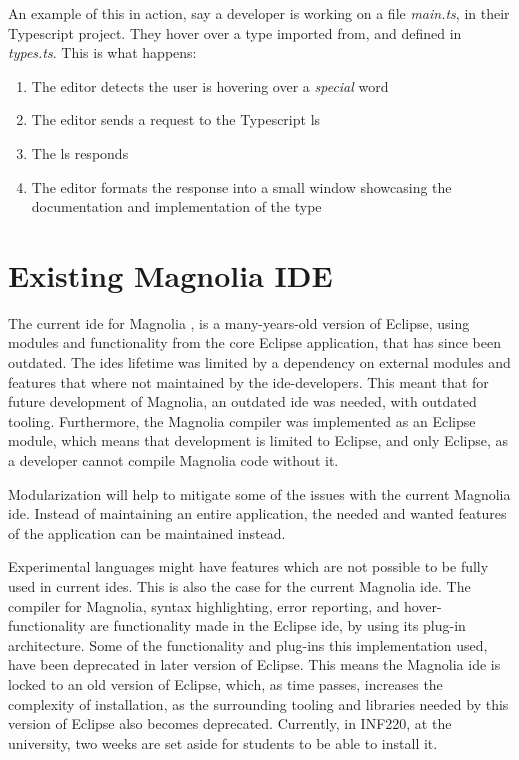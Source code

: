 An example of this in action, say a developer is working on a file
\textit{main.ts}, in their Typescript project. They hover over a type imported
from, and defined in \textit{types.ts}. This is what happens:

\begin{enumerate}
  \item The editor detects the user is hovering over a \textit{special} word
  \item The editor sends a request to the Typescript \gls{ls}
  \item The \gls{ls} responds
  \item The editor formats the response into a small window showcasing the
    documentation and implementation of the type
\end{enumerate}

\section{Existing Magnolia IDE}

The current \gls{ide} for Magnolia \cite{baggeIde}, is a many-years-old version
of Eclipse, using modules and functionality from the core Eclipse application,
that has since been outdated. The \gls{ide}s lifetime was limited by a
dependency on external modules and features that where not maintained by the
\gls{ide}-developers. This meant that for future development of Magnolia, an
outdated \gls{ide} was needed, with outdated tooling. Furthermore, the Magnolia
compiler was implemented as an Eclipse module, which means that development is
limited to Eclipse, and only Eclipse, as a developer cannot compile Magnolia
code without it.

Modularization will help to mitigate some of the issues with the current
Magnolia \gls{ide}. Instead of maintaining an entire application, the needed and
wanted features of the application can be maintained instead.

Experimental languages might have features which are not possible to be fully
used in current \gls{ide}s. This is also the case for the current Magnolia
\gls{ide}. The compiler for Magnolia, syntax highlighting, error reporting, and
hover-functionality are functionality made in the Eclipse \gls{ide}, by using
its plug-in architecture. Some of the functionality and plug-ins this
implementation used, have been deprecated in later version of Eclipse. This
means the Magnolia \gls{ide} is locked to an old version of Eclipse, which, as
time passes, increases the complexity of installation, as the surrounding
tooling and libraries needed by this version of Eclipse also becomes deprecated.
Currently, in INF220, at the university, two weeks are set aside for students to
be able to install it.


